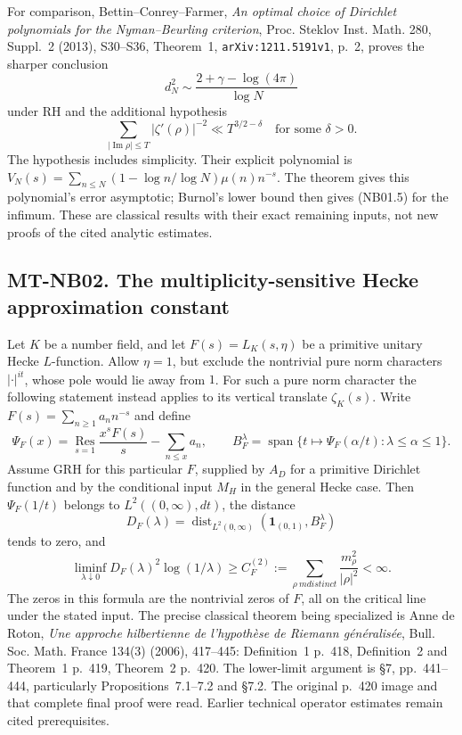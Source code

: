 For comparison, Bettin--Conrey--Farmer,
\emph{An optimal choice of Dirichlet polynomials for the
Nyman--Beurling criterion}, Proc. Steklov Inst. Math.
280, Suppl.~2 (2013), S30--S36, Theorem~1,
\texttt{arXiv:1211.5191v1}, p.~2, proves the sharper conclusion
\[
 d_N^2\sim\frac{2+\gamma-\log(4\pi)}{\log N}
 \tag{NB01.5}
\]
under RH and the additional hypothesis
\[
 \sum_{|\operatorname{Im}\rho|\le T}
                    |\zeta'(\rho)|^{-2}
                  \ll T^{3/2-\delta}\quad\text{for some }\delta>0.
 \tag{NB01.6}
\]
The hypothesis includes simplicity. Their explicit polynomial is
$V_N(s)=\sum_{n\le N}(1-\log n/\log N)\mu(n)n^{-s}$.
The theorem gives this polynomial's error asymptotic; Burnol's
lower bound then gives (NB01.5) for the infimum. These are
classical results with their exact remaining inputs, not new
proofs of the cited analytic estimates.

\subsection*{MT-NB02. The multiplicity-sensitive Hecke approximation constant}

Let $K$ be a number field, and let $F(s)=L_K(s,\eta)$ be a
primitive unitary Hecke $L$-function. Allow $\eta=1$, but exclude
the nontrivial pure norm characters $|\cdot|^{it}$, whose pole
would lie away from $1$. For such a pure norm character the
following statement instead applies to its vertical translate
$\zeta_K(s)$. Write $F(s)=\sum_{n\ge1}a_n n^{-s}$ and define
\[
 \Psi_F(x)=\operatorname*{Res}_{s=1}
                   \frac{x^s F(s)}s-\sum_{n\le x}a_n,
 \qquad
 B_F^\lambda=\operatorname{span}\{
                  t\longmapsto\Psi_F(\alpha/t):
                               \lambda\le\alpha\le1\}.
 \tag{NB02.1}
\]
Assume GRH for this particular $F$, supplied by $A_D$ for a
primitive Dirichlet function and by the conditional input
$M_H$ in the general Hecke case. Then $\Psi_F(1/t)$ belongs
to $L^2((0,\infty),dt)$, the distance
\[
 D_F(\lambda)=\operatorname{dist}_{L^2(0,\infty)}
                      (\mathbf1_{(0,1)},B_F^\lambda)
 \tag{NB02.2}
\]
tends to zero, and
\[
 \liminf_{\lambda\downarrow0}D_F(\lambda)^2\log(1/\lambda)
    \ge C_F^{(2)}:=\sum_{\rho\ {
m distinct}}
                          \frac{m_\rho^2}{|\rho|^2}<\infty.
 \tag{NB02.3}
\]
The zeros in this formula are the nontrivial zeros of $F$,
all on the critical line under the stated input.
The precise classical theorem being specialized is
Anne de Roton, \emph{Une approche hilbertienne de
l'hypoth\`ese de Riemann g\'en\'eralis\'ee}, Bull. Soc.
Math. France 134(3) (2006), 417--445: Definition~1 p.~418,
Definition~2 and Theorem~1 p.~419, Theorem~2 p.~420.
The lower-limit argument is \S7, pp.~441--444, particularly
Propositions~7.1--7.2 and \S7.2. The original p.~420 image
and that complete final proof were read. Earlier technical
operator estimates remain cited prerequisites.

